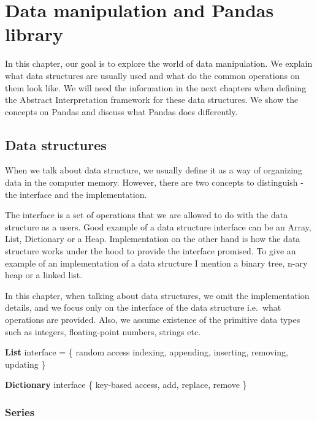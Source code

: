 \chapter{Data manipulation and Pandas library}

In this chapter, our goal is to explore the world of data manipulation.
We explain what data structures are usually used and what do the common operations on them look like.
We will need the information in the next chapters when defining the Abstract Interpretation framework for these data
structures.
We show the concepts on Pandas and discuss what Pandas does differently.

\section{Data structures} %

When we talk about data structure, we usually define it as a way of organizing data in the computer memory.
However, there are two concepts to distinguish - the interface and the implementation.

The interface is a set of operations that we are allowed to do with the data structure as a users.
Good example of a data structure interface can be an Array, List, Dictionary or a Heap.
Implementation on the other hand is how the data structure works under the hood to provide the interface promised.
To give an example of an implementation of a data structure I mention a binary tree, n-ary heap or a linked list.

In this chapter, when talking about data structures, we omit the implementation details, and we focus only on the
interface of the data structure i.e.\ what operations are provided.
Also, we assume existence of the primitive data types such as integers, floating-point numbers, strings etc.

\begin{defn}
    \textbf{List} interface = \{ random access indexing, appending, inserting, removing, updating \} %

    \textbf{Dictionary} interface \{ key-based access, add, replace, remove \} %

\end{defn}

\subsection{Series}

